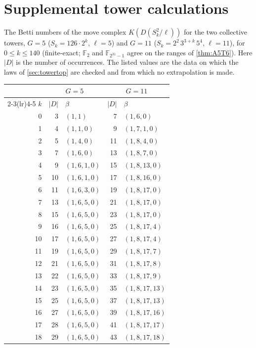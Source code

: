 \section{Supplemental tower calculations}\label{app:towers}
The Betti numbers of the move complex $K(D(S_k^2/\ell))$ for the two collective towers, $G=5$ ($S_k=126\cdot2^k$, $\ell=5$) and $G=11$ ($S_k=2^2\,3^{3+k}\,5^4$, $\ell=11$), for $0\le k\le 140$ (finite-exact; $\mathbb F_2$ and $\mathbb F_{2^{31}-1}$ agree on the ranges of \cref{thm:A5T6}). Here $|D|$ is the number of occurrences. The listed values are the data on which the laws of \cref{sec:towertop} are checked and from which no extrapolation is made.
\begin{center}\scriptsize\begin{longtable}{@{}rrlrl@{}}\toprule
 & \multicolumn{2}{c}{$G=5$} & \multicolumn{2}{c}{$G=11$}\\\cmidrule(lr){2-3}\cmidrule(lr){4-5}
$k$ & $|D|$ & $\beta$ & $|D|$ & $\beta$\\\midrule\endhead
0 & 3 & $(1,1)$ & 7 & $(1,6,0)$\\
1 & 4 & $(1,1,0)$ & 9 & $(1,7,1,0)$\\
2 & 5 & $(1,4,0)$ & 11 & $(1,8,4,0)$\\
3 & 7 & $(1,6,0)$ & 13 & $(1,8,7,0)$\\
4 & 9 & $(1,6,1,0)$ & 15 & $(1,8,13,0)$\\
5 & 10 & $(1,6,1,0)$ & 17 & $(1,8,16,0)$\\
6 & 11 & $(1,6,3,0)$ & 19 & $(1,8,17,0)$\\
7 & 13 & $(1,6,5,0)$ & 21 & $(1,8,17,0)$\\
8 & 15 & $(1,6,5,0)$ & 23 & $(1,8,17,0)$\\
9 & 16 & $(1,6,5,0)$ & 25 & $(1,8,17,4)$\\
10 & 17 & $(1,6,5,0)$ & 27 & $(1,8,17,4)$\\
11 & 19 & $(1,6,5,0)$ & 29 & $(1,8,17,7)$\\
12 & 21 & $(1,6,5,0)$ & 31 & $(1,8,17,8)$\\
13 & 22 & $(1,6,5,0)$ & 33 & $(1,8,17,9)$\\
14 & 23 & $(1,6,5,0)$ & 35 & $(1,8,17,13)$\\
15 & 25 & $(1,6,5,0)$ & 37 & $(1,8,17,13)$\\
16 & 27 & $(1,6,5,0)$ & 39 & $(1,8,17,16)$\\
17 & 28 & $(1,6,5,0)$ & 41 & $(1,8,17,17)$\\
18 & 29 & $(1,6,5,0)$ & 43 & $(1,8,17,18)$\\

\end{longtable}
\end{center}
